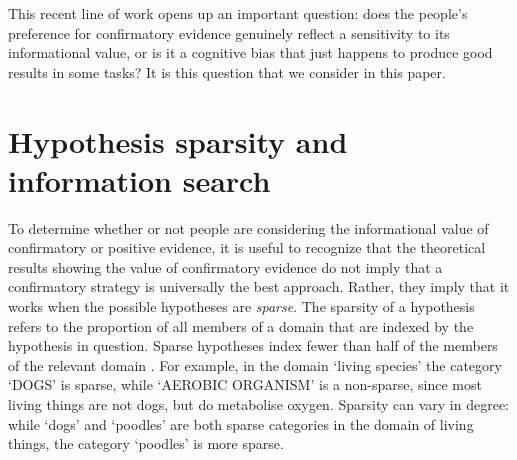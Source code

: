 \documentclass[10pt,letterpaper]{article}
\begin{document}
This recent line of work opens up an important question: does the people's preference for confirmatory evidence genuinely reflect a sensitivity to its informational value, or is it a cognitive bias that just happens to produce good results in some tasks? It is this question that we consider in this paper.


\section{Hypothesis sparsity and information search}

To determine whether or not people are considering the informational value of confirmatory or positive evidence, it is useful to recognize that the theoretical results showing the value of confirmatory evidence \cite{klayman1987confirmation,austerweil2011deterministic,navarro2011sparsecat} do not imply that a confirmatory strategy is %
 universally the best approach. Rather, they imply that it works when the possible hypotheses are {\it sparse}. The sparsity of a hypothesis refers to the proportion of all members of a domain that are indexed by the hypothesis in question. Sparse hypotheses index fewer than half of the members of the relevant domain \cite{navarro2011sparsecat}. For example, in the domain `living species' the category `DOGS' is sparse, while `AEROBIC ORGANISM' is a non-sparse, since most living things are not dogs, but do metabolise oxygen. Sparsity can vary in degree: while `dogs' and `poodles' are both sparse categories in the domain of living things, the category `poodles' is more sparse. 


\end{document}
